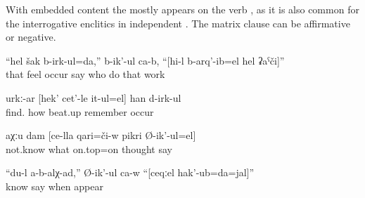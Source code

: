 With embedded content  the  mostly appears on the verb , as it is also common for the interrogative enclitics in independent . The matrix clause can be affirmative or negative.
%
\begin{exe}
	\ex	\label{ex:I suspect, says the fox, whose work this was}
	\gll	``hel	šak	b-irk-ul=da,''	b-ik'-ul	ca-b,	``[hi-l	b-arq'-ib=el	hel	ʡaˁči]''\\
		that	feel	occur	say		who	do	that	work\\
	\glt	{}

	\ex	\label{ex:(He) probably remembers how he beat her up@18}
	\gll	urkː-ar	[hek'	cet'-le	it-ul=el]	han	d-irk-ul\\
		find.		how	beat.up	remember	occur\\
	\glt	{}

	\ex	\label{ex:I don't know about what he is thinking@22}
	\gll	aχːu	dam	[ce-lla	qari=či-w	pikri	Ø-ik'-ul=el]\\
		not.know		what	on.top=on	thought	say\\
	\glt	{}

	\ex	\label{ex:‎The horse said, I do not know when I was born}
	\gll	``du-l	a-b-alχ-ad,''	Ø-ik'-ul	ca-w	``[ceqːel	hak'-ub=da=jal]''\\
			know	say		when	appear\\
	\glt	{}
\end{exe}

